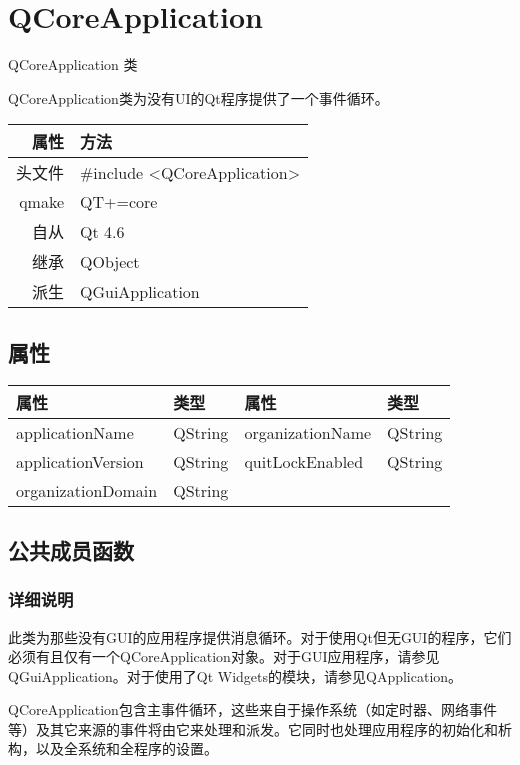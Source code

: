 \chapter{QCoreApplication}

QCoreApplication 类

QCoreApplication类为没有UI的Qt程序提供了一个事件循环。

\begin{tabular}{|r|l|}
\hline
属性&	方法\\
\hline
头文件&	\#include <QCoreApplication>\\
\hline
qmake&	QT+=core\\
\hline
自从&	Qt 4.6\\
\hline
继承&	QObject\\
\hline
派生&	QGuiApplication\\
\hline
\end{tabular}

\section{属性}

\begin{tabular}{|l|l|l|l|}
\hline
属性&	类型&	属性&	类型\\
\hline
applicationName&	QString&	organizationName&	QString\\
\hline
applicationVersion&	QString&	quitLockEnabled	&QString\\
\hline
organizationDomain&	QString&		&\\
\hline
\end{tabular}

\splitLine

\section{公共成员函数}

\subsection{详细说明}

此类为那些没有GUI的应用程序提供消息循环。对于使用Qt但无GUI的程序，它们必须有且仅有一个QCoreApplication对象。对于GUI应用程序，请参见QGuiApplication。对于使用了Qt Widgets的模块，请参见QApplication。

QCoreApplication包含主事件循环，这些来自于操作系统（如定时器、网络事件等）及其它来源的事件将由它来处理和派发。它同时也处理应用程序的初始化和析构，以及全系统和全程序的设置。

